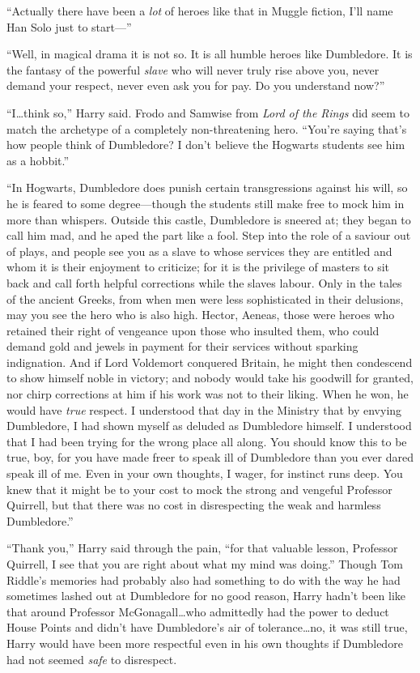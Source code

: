“Actually there have been a \emph{lot} of heroes like that in Muggle fiction, I’ll name Han Solo just to start—”

“Well, in magical drama it is not so. It is all humble heroes like Dumbledore. It is the fantasy of the powerful \emph{slave} who will never truly rise above you, never demand your respect, never even ask you for pay. Do you understand now?”

“I…think so,” Harry said. Frodo and Samwise from \emph{Lord of the Rings} did seem to match the archetype of a completely non-threatening hero. “You’re saying that’s how people think of Dumbledore? I don’t believe the Hogwarts students see him as a hobbit.”

“In Hogwarts, Dumbledore does punish certain transgressions against his will, so he is feared to some degree—though the students still make free to mock him in more than whispers. Outside this castle, Dumbledore is sneered at; they began to call him mad, and he aped the part like a fool. Step into the role of a saviour out of plays, and people see you as a slave to whose services they are entitled and whom it is their enjoyment to criticize; for it is the privilege of masters to sit back and call forth helpful corrections while the slaves labour. Only in the tales of the ancient Greeks, from when men were less sophisticated in their delusions, may you see the hero who is also high. Hector, Aeneas, those were heroes who retained their right of vengeance upon those who insulted them, who could demand gold and jewels in payment for their services without sparking indignation. And if Lord Voldemort conquered Britain, he might then condescend to show himself noble in victory; and nobody would take his goodwill for granted, nor chirp corrections at him if his work was not to their liking. When he won, he would have \emph{true} respect. I understood that day in the Ministry that by envying Dumbledore, I had shown myself as deluded as Dumbledore himself. I understood that I had been trying for the wrong place all along. You should know this to be true, boy, for you have made freer to speak ill of Dumbledore than you ever dared speak ill of me. Even in your own thoughts, I wager, for instinct runs deep. You knew that it might be to your cost to mock the strong and vengeful Professor Quirrell, but that there was no cost in disrespecting the weak and harmless Dumbledore.”

“Thank you,” Harry said through the pain, “for that valuable lesson, Professor Quirrell, I see that you are right about what my mind was doing.” Though Tom Riddle’s memories had probably also had something to do with the way he had sometimes lashed out at Dumbledore for no good reason, Harry hadn’t been like that around Professor McGonagall…who admittedly had the power to deduct House Points and didn’t have Dumbledore’s air of tolerance…no, it was still true, Harry would have been more respectful even in his own thoughts if Dumbledore had not seemed \emph{safe} to disrespect.

